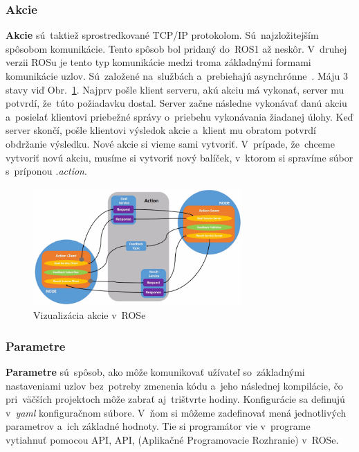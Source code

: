 \subsubsection{Akcie}
\label{sec:actions}
	\textbf {Akcie} sú~taktiež sprostredkované TCP/IP protokolom. Sú~najzložitejším spôsobom
	komunikácie. Tento spôsob bol pridaný do~ROS1 až neskôr. V~druhej verzii ROSu je tento
	typ komunikácie medzi troma základnými formami komunikácie uzlov. Sú~založené na~službách
	a~prebiehajú asynchrónne~\cite{ROS2book}. Máju 3 stavy viď Obr.~\ref{fig:action}.
	Najprv pošle klient serveru, akú akciu má vykonať, server mu potvrdí, že~túto požiadavku
	dostal. Server začne následne vykonávať danú akciu a~posielať klientovi priebežné správy
	o~priebehu vykonávania žiadanej úlohy. Keď server skončí, pošle klientovi výsledok akcie
	a~klient mu obratom potvrdí obdržanie výsledku. Nové akcie si vieme sami vytvoriť.
	V~prípade, že~chceme vytvoriť novú akciu, musíme si vytvoriť nový balíček, v~ktorom
	si spravíme súbor s~príponou \textit{.action}.

\clearpage

	\begin{figure}[!htbp]
		\centering
		\includegraphics[width=8cm]{img/actionExplanation.png}
		\caption{Vizualizácia akcie v~ROSe~\cite{RosDoc}}
		\label{fig:action}
	\end{figure}

\subsubsection{Parametre}
\label{sec:parametre}

\textbf{Parametre} sú~spôsob, ako môže komunikovať užívateľ so~základnými nastaveniami uzlov
bez~potreby zmenenia kódu a~jeho následnej kompilácie, čo pri~väčších projektoch môže zabrať
aj~trištvrte hodiny. Konfigurácie sa definujú v~\textit{yaml} konfiguračnom súbore. V~ňom si
môžeme zadefinovať mená jednotlivých parametrov a~ich základné hodnoty. Tie si programátor
vie v~programe vytiahnuť pomocou API, \acrlong{API}, (Aplikačné Programovacie Rozhranie) v~ROSe.

